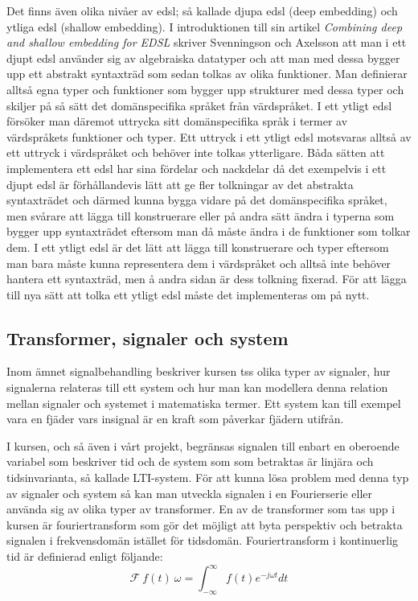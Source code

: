 \documentclass[12pt,a4paper,twoside,openright]{article}
\begin{document}
Det finns även olika nivåer av \gls{edsl}; så kallade djupa \gls{edsl} (deep
embedding) och ytliga \gls{edsl} (shallow embedding). I introduktionen till
sin artikel \textit{Combining deep and shallow embedding for EDSL} skriver
Svenningson och Axelsson \cite{Svenningsson2012combining} att man i ett djupt
\gls{edsl} använder sig av algebraiska datatyper och att man med dessa
bygger upp ett abstrakt syntaxträd som sedan tolkas av olika
funktioner. Man definierar alltså egna typer och funktioner som bygger
upp strukturer med dessa typer och skiljer på så sätt det
domänspecifika språket från värdspråket. I ett ytligt \gls{edsl} försöker
man däremot uttrycka sitt domänspecifika språk i termer av
värdspråkets funktioner och typer. Ett uttryck i ett ytligt \gls{edsl}
motsvaras alltså av ett uttryck i värdspråket och behöver inte tolkas
ytterligare. Båda sätten att implementera ett \gls{edsl} har sina fördelar
och nackdelar då det exempelvis i ett djupt \gls{edsl} är förhållandevis
lätt att ge fler tolkningar av det abstrakta syntaxträdet och därmed
kunna bygga vidare på det domänspecifika språket, men svårare att
lägga till konstruerare eller på andra sätt ändra i typerna som bygger
upp syntaxträdet eftersom man då måste ändra i de funktioner som
tolkar dem. I ett ytligt \gls{edsl} är det lätt att lägga till konstruerare
och typer eftersom man bara måste kunna representera dem i värdspråket
och alltså inte behöver hantera ett syntaxträd, men å andra sidan är
dess tolkning fixerad. För att lägga till nya sätt att tolka ett
ytligt \gls{edsl} måste det implementeras om på nytt.

\subsection{Transformer, signaler och system}
Inom ämnet signalbehandling beskriver kursen \gls{tss} olika typer av
signaler, hur signalerna relateras till ett system och hur man kan
modellera denna relation mellan signaler och systemet i matematiska
termer. Ett system kan till exempel vara en fjäder vars insignal är en
kraft som påverkar fjädern utifrån.

I kursen, och så även i vårt projekt, begränsas signalen till enbart
en oberoende variabel som beskriver tid och de system som som
betraktas är linjära och tidsinvarianta, så kallade LTI-system. För
att kunna lösa problem med denna typ av signaler och system så kan man
utveckla signalen i en Fourierserie eller använda sig av olika typer
av transformer. En av de transformer som tas upp i kursen är
fouriertransform som gör det möjligt att byta perspektiv och betrakta
signalen i frekvensdomän istället för tidsdomän.
%
%
Fouriertransform i kontinuerlig tid är definierad enligt följande:
\[\mathcal{F}~f(t)~\omega = \int_{-\infty}^{\infty} f(t) e^{-j \omega t} dt\]
\end{document}
